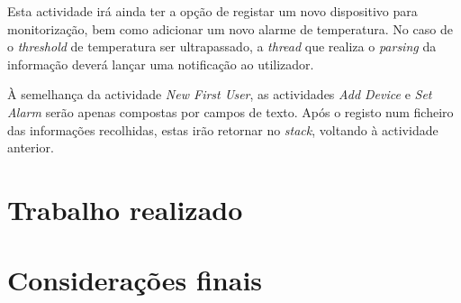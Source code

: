 \documentclass[a4paper]{article}
\begin{document}
Esta actividade irá ainda ter a opção de registar um novo dispositivo para monitorização, bem como adicionar um novo alarme de temperatura. No caso de o \textit{threshold} de temperatura ser ultrapassado, a \textit{thread} que realiza o \textit{parsing} da informação deverá lançar uma notificação ao utilizador.

À semelhança da actividade \textit{New First User}, as actividades \textit{Add Device} e \textit{Set Alarm} serão apenas compostas por campos de texto. Após o registo num ficheiro das informações recolhidas, estas irão retornar no \textit{stack}, voltando à actividade anterior.

\section{Trabalho realizado}
\section{Considerações finais}
\end{document}

